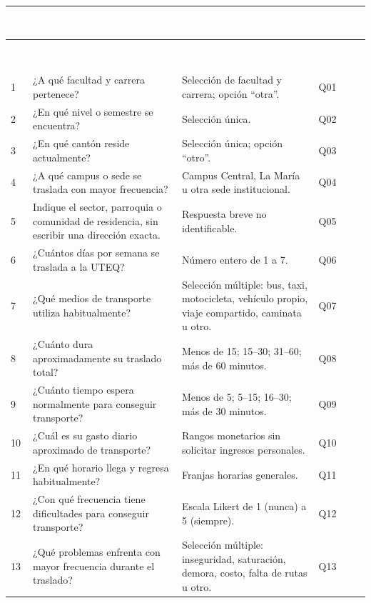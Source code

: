 \documentclass[10pt,a4paper]{article}
\begin{document}
\begingroup
\scriptsize
\setlength{\LTleft}{0pt}
\setlength{\LTright}{0pt}
\begin{longtable}{C{0.65cm} P{7.1cm} P{5.25cm} C{1.35cm}}
\textcolor{white}{\textbf{N.}} &
\textcolor{white}{\textbf{Pregunta}} &
\textcolor{white}{\textbf{Tipo de respuesta u opciones}} &
\textcolor{white}{\textbf{Variable}}\\
\endfirsthead
{}
\textcolor{white}{\textbf{N.}} &
\textcolor{white}{\textbf{Pregunta}} &
\textcolor{white}{\textbf{Tipo de respuesta u opciones}} &
\textcolor{white}{\textbf{Variable}}\\
 & ¿A qué facultad y carrera pertenece? & Selección de facultad y carrera; opción ``otra''. & Q01\\
2 & ¿En qué nivel o semestre se encuentra? & Selección única. & Q02\\
3 & ¿En qué cantón reside actualmente? & Selección única; opción ``otro''. & Q03\\
4 & ¿A qué campus o sede se traslada con mayor frecuencia? & Campus Central, La María u otra sede institucional. & Q04\\
5 & Indique el sector, parroquia o comunidad de residencia, sin escribir una dirección exacta. & Respuesta breve no identificable. & Q05\\
6 & ¿Cuántos días por semana se traslada a la UTEQ? & Número entero de 1 a 7. & Q06\\
7 & ¿Qué medios de transporte utiliza habitualmente? & Selección múltiple: bus, taxi, motocicleta, vehículo propio, viaje compartido, caminata u otro. & Q07\\
8 & ¿Cuánto dura aproximadamente su traslado total? & Menos de 15; 15--30; 31--60; más de 60 minutos. & Q08\\
9 & ¿Cuánto tiempo espera normalmente para conseguir transporte? & Menos de 5; 5--15; 16--30; más de 30 minutos. & Q09\\
10 & ¿Cuál es su gasto diario aproximado de transporte? & Rangos monetarios sin solicitar ingresos personales. & Q10\\
11 & ¿En qué horario llega y regresa habitualmente? & Franjas horarias generales. & Q11\\
12 & ¿Con qué frecuencia tiene dificultades para conseguir transporte? & Escala Likert de 1 (nunca) a 5 (siempre). & Q12\\
13 & ¿Qué problemas enfrenta con mayor frecuencia durante el traslado? & Selección múltiple: inseguridad, saturación, demora, costo, falta de rutas u otro. & Q13\\

\end{longtable}
\end{document}
